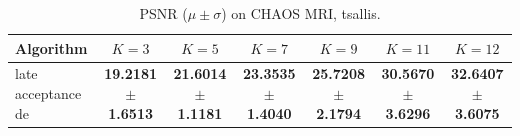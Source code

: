 \begin{table}[htbp]
\centering
\caption{PSNR ($\mu \pm \sigma$) on CHAOS MRI, tsallis.}
\label{tab:exp2-tsallis-psnr}
\begin{tabular}{lcccccc}
\toprule
Algorithm & $K=3$ & $K=5$ & $K=7$ & $K=9$ & $K=11$ & $K=12$ \\
\midrule
late acceptance de & \textbf{19.2181 $\pm$ 1.6513} & \textbf{21.6014 $\pm$ 1.1181} & \textbf{23.3535 $\pm$ 1.4040} & \textbf{25.7208 $\pm$ 2.1794} & \textbf{30.5670 $\pm$ 3.6296} & \textbf{32.6407 $\pm$ 3.6075} \\
\bottomrule
\end{tabular}
\end{table}